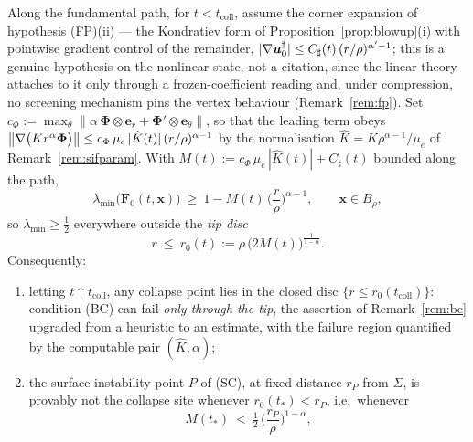 \begin{proposition}
    \label{prop:tipdisc}
    Along the fundamental path, for $t<t_{\mathrm{coll}}$, assume the corner expansion of hypothesis (FP)(ii) ---
    the Kondratiev form of Proposition~\ref{prop:blowup}(i) with pointwise gradient control of the remainder,
    $|\nabla\bm u_0^\sharp|\le C_\sharp(t)\,(r/\rho)^{\alpha'-1}$; this is a genuine hypothesis on the nonlinear
    state, not a citation, since the linear theory \cite{KMR2001,MazyaRossmann2010} attaches to it only through a
    frozen-coefficient reading and, under compression, no screening mechanism pins the vertex behaviour
    (Remark~\ref{rem:fp}). Set
    $c_\Phi:=\max_\theta\big\|\alpha\,\bm\Phi\otimes\bm e_r+\bm\Phi'\otimes\bm e_\theta\big\|$, so that the leading
    term obeys $\big\|\nabla\big(K r^\alpha\bm\Phi\big)\big\|\le c_\Phi\,\mu_e\,|\hat K(t)|\,(r/\rho)^{\alpha-1}$ by
    the normalisation $\hat K=K\rho^{\alpha-1}/\mu_e$ of Remark~\ref{rem:sifparam}. With
    $M(t):=c_\Phi\,\mu_e\,|\hat K(t)|+C_\sharp(t)$ bounded along the path,
    \begin{equation}
        \label{eq:tipfloor}
        \lambda_{\min}\big(\bm F_0(t,\bm x)\big)\ \ge\ 1-M(t)\,\Big(\frac{r}{\rho}\Big)^{\alpha-1},
        \qquad \bm x\in B_\rho ,
    \end{equation}
    so $\lambda_{\min}\ge\tfrac12$ everywhere outside the \emph{tip disc}
    \begin{equation}
        \label{eq:tipradius}
        r\ \le\ r_0(t):=\rho\,\big(2M(t)\big)^{\frac{1}{1-\alpha}} .
    \end{equation}
    Consequently:
    \begin{enumerate}
        \item[\textup{(i)}] letting $t\uparrow t_{\mathrm{coll}}$, any collapse point lies in the closed disc
              $\{r\le r_0(t_{\mathrm{coll}})\}$: condition (BC) can fail \emph{only through the tip}, the assertion of
              Remark~\ref{rem:bc} upgraded from a heuristic to an estimate, with the failure region quantified by the
              computable pair $(\hat K,\alpha)$;
        \item[\textup{(ii)}] the surface-instability point $P$ of (SC), at fixed distance $r_P$ from $\Sigma$, is
              provably not the collapse site whenever $r_0(t_*)<r_P$, i.e.\ whenever
              \begin{equation}
                  \label{eq:scsafe}
                  M(t_*) \ <\ \tfrac12\,\Big(\frac{r_P}{\rho}\Big)^{1-\alpha},

\end{equation}
\end{enumerate}
\end{proposition}

